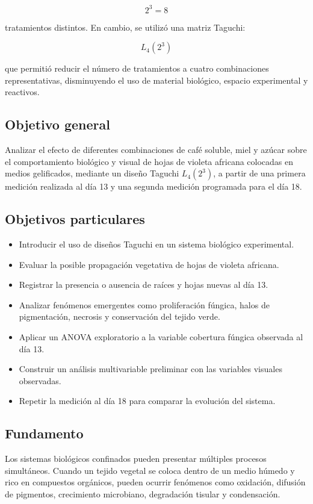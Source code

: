 \[
2^3=8
\]

tratamientos distintos. En cambio, se utilizó una matriz Taguchi:

\[
L_4(2^3)
\]

que permitió reducir el número de tratamientos a cuatro combinaciones representativas, disminuyendo el uso de material biológico, espacio experimental y reactivos.

\subsection{Objetivo general}

Analizar el efecto de diferentes combinaciones de café soluble, miel y azúcar sobre el comportamiento biológico y visual de hojas de violeta africana colocadas en medios gelificados, mediante un diseño Taguchi \(L_4(2^3)\), a partir de una primera medición realizada al día 13 y una segunda medición programada para el día 18.

\subsection{Objetivos particulares}

\begin{itemize}
\item Introducir el uso de diseños Taguchi en un sistema biológico experimental.
\item Evaluar la posible propagación vegetativa de hojas de violeta africana.
\item Registrar la presencia o ausencia de raíces y hojas nuevas al día 13.
\item Analizar fenómenos emergentes como proliferación fúngica, halos de pigmentación, necrosis y conservación del tejido verde.
\item Aplicar un ANOVA exploratorio a la variable cobertura fúngica observada al día 13.
\item Construir un análisis multivariable preliminar con las variables visuales observadas.
\item Repetir la medición al día 18 para comparar la evolución del sistema.
\end{itemize}

\subsection{Fundamento}

Los sistemas biológicos confinados pueden presentar múltiples procesos simultáneos. Cuando un tejido vegetal se coloca dentro de un medio húmedo y rico en compuestos orgánicos, pueden ocurrir fenómenos como oxidación, difusión de pigmentos, crecimiento microbiano, degradación tisular y condensación.

